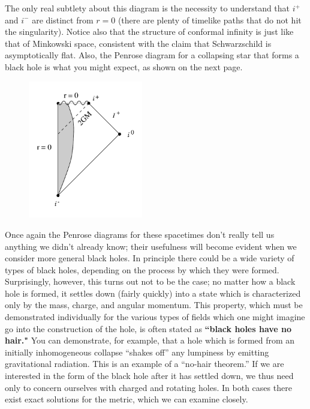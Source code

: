 \documentclass[12pt]{article}
\begin{document}
\noindent  The only real subtlety about this diagram is
the necessity to understand that $i^+$ and $i^-$ are distinct
from $r=0$ (there are plenty of timelike paths that do not
hit the singularity).  Notice also that the structure of
conformal infinity is just like that of Minkowski space,
consistent with the claim that Schwarzschild is asymptotically
flat.  Also, the Penrose diagram for a collapsing star that
forms a black hole is what you might expect, as shown on the
next page.

\begin{figure}
  \centerline{
  \includegraphics[height=6cm]{pdf/seven25}}
\end{figure}

Once again the Penrose diagrams for these spacetimes don't
really tell us anything we didn't already know; their usefulness
will become evident when we consider more
general black holes.  In principle there
could be a wide variety of types of black holes, depending on
the process by which they were formed.  Surprisingly, however,
this turns out not to be the case; no matter how a black
hole is formed, it settles down (fairly quickly) into a
state which is characterized only by the mass, charge, and
angular momentum.  This property, which must be demonstrated
individually for the various types of fields which one might
imagine go into the construction of the hole, is often
stated as {\bf ``black holes have no hair."}  You can 
demonstrate, for example, that a hole which is formed from
an initially inhomogeneous collapse ``shakes off'' any
lumpiness by emitting gravitational radiation.  This is an
example of a ``no-hair theorem.''  If we are interested in
the form of the black hole after it has settled down, we thus
need only to concern ourselves with charged and rotating
holes.  In both cases there exist exact
solutions for the metric, which we can examine closely.
\end{document}
